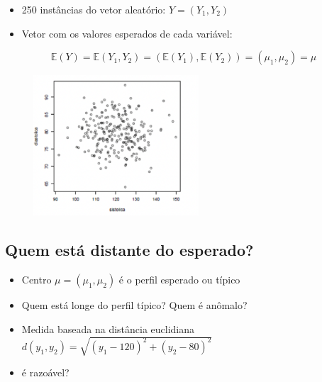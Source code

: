 \documentclass[
  letterpaper,
  DIV=11,
  numbers=noendperiod]{scrartcl}
\providecommand{\tightlist}{%
  \setlength{\itemsep}{0pt}\setlength{\parskip}{0pt}}\usepackage{longtable,booktabs,array}
\begin{document}
\begin{itemize}
\tightlist
\item
  250 instâncias do vetor aleatório: \(Y = (Y_1, Y_2)\)
\item
  Vetor com os valores esperados de cada variável:
\end{itemize}

\[\mathbb E(Y) = \mathbb E(Y_1,Y_2) = (\mathbb E(Y_1), \mathbb E(Y_2)) = (\mu_1, \mu_2) = \mu\]

\begin{figure}

{\centering \includegraphics[width=0.55\textwidth,height=\textheight]{figs/Aula07/pressao.png}

}

\end{figure}

\hypertarget{quem-estuxe1-distante-do-esperado}{%
\subsection{Quem está distante do
esperado?}\label{quem-estuxe1-distante-do-esperado}}

\begin{itemize}
\tightlist
\item
  Centro \(\mu = (\mu_1, \mu_2)\) é o perfil esperado ou típico
\item
  Quem está longe do perfil típico? Quem é anômalo?
\item
  Medida baseada na distância euclidiana
  \(d(y_1,y_2) = \sqrt{(y_1-120)^2+ (y_2-80)^2}\)
\item
  é razoável?
\end{itemize}
\end{document}
